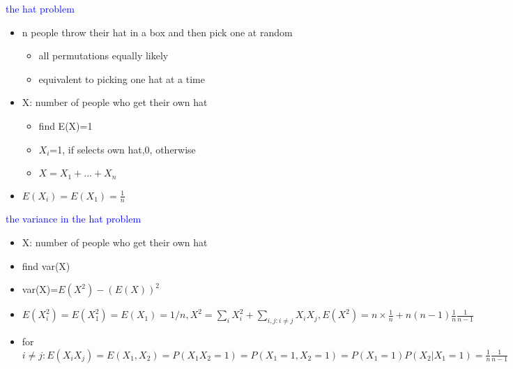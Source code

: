 \textcolor{blue}{the hat problem}

\begin{itemize}
    \item n people throw their hat in a box and then pick one at random
    \begin{itemize}
        \item all permutations equally likely
        \item equivalent to picking one hat at a time
    \end{itemize}
    \item X: number of people who get their own hat
    \begin{itemize}
        \item  find E(X)=1
        \item $X_i$=1, if selects own hat,0, otherwise
        \item $X=X_1+...+X_n$
    \end{itemize}
    \item $E(X_i)=E(X_1)=\frac{1}{n}$
\end{itemize}

\textcolor{blue}{the variance in the hat problem}

\begin{itemize}
    \item X: number of people who get their own hat
    \item find var(X)
    \item var(X)=$E(X^2)-(E(X))^2$
    \item $E(X_i^2)=E(X_1^2)=E(X_1)=1/n,X^2=\sum_i X_i^2+\sum_{i,j:i\neq j}X_i X_j,E(X^2)=n\times \frac{1}{n} +n(n-1)\frac{1}{n}\frac{1}{n-1}$
    \item for $i \neq j:E(X_i X_j)=E(X_1,X_2)=P(X_1 X_2=1)=P(X_1=1,X_2=1)=P(X_1=1)P(X_2|X_1=1)=\frac{1}{n}\frac{1}{n-1}$
\end{itemize}


